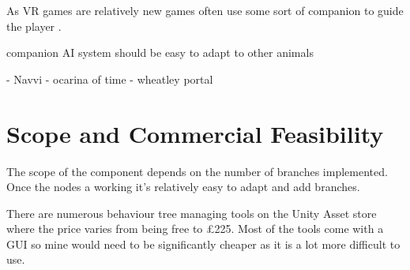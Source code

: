 \documentclass{scrartcl}
\begin{document}
As VR games are relatively new games often use some sort of companion to guide the player \cite{RobinsonVR} .


companion AI system 
should be easy to adapt to other animals

- Navvi - ocarina of time
- wheatley portal



\section{Scope and Commercial Feasibility}
The scope of the component depends on the number of branches implemented. Once the nodes a working it's relatively easy to adapt and add branches.

There are numerous behaviour tree managing tools on the Unity Asset store where the price varies from being free to \pounds225. Most of the tools come with a GUI so mine would need to be significantly cheaper as it is a lot more difficult to use.



	
\end{document}
